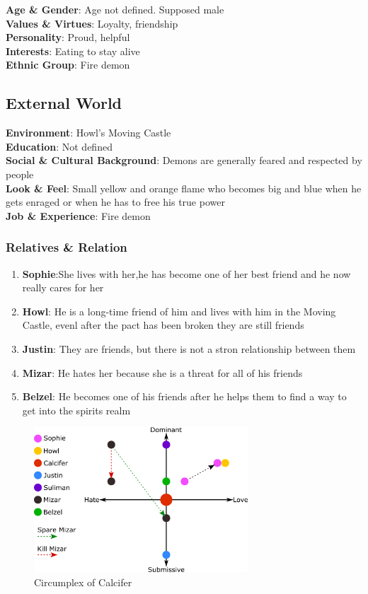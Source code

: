 \textbf{Age \& Gender}: Age not defined. Supposed male \\
\textbf{Values \& Virtues}: Loyalty, friendship\\
\textbf{Personality}: Proud, helpful \\
\textbf{Interests}: Eating to stay alive\\
\textbf{Ethnic Group}: Fire demon

\subsection{External World}
\textbf{Environment}: Howl’s Moving Castle \\
\textbf{Education}: Not defined \\
\textbf{Social \& Cultural Background}: Demons are generally feared and respected by people \\
\textbf{Look \& Feel}: Small yellow and orange flame who becomes big and  blue when he gets enraged or when he has to free his true power\\
\textbf{Job \& Experience}: Fire demon \\

\subsubsection*{Relatives \& Relation}
\begin{enumerate}
\item \textbf{Sophie}:She lives with her,he has become one of her best friend and he now really cares for her
\item \textbf{Howl}: He is a long-time friend of him and lives with him in the Moving Castle, evenl after the pact has been broken they are still friends
\item \textbf{Justin}: They are friends, but there is not a stron relationship between them
\item \textbf{Mizar}: He hates her because she is a threat for all of his friends
\item \textbf{Belzel}: He becomes one of his friends after he helps them to find a way to get into the spirits realm
\end{enumerate}

\begin{figure}[H]
  \centering
  \includegraphics[width=8cm]{Images/SVG/Exported/Circumplexes/calciferCircumplex}
  \caption{Circumplex of Calcifer}
\end{figure}

